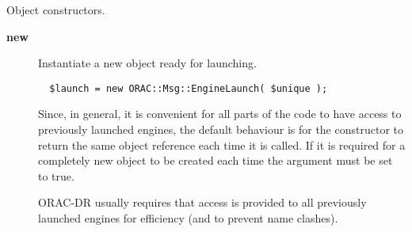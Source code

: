 Object constructors.

\begin{description}

\item[{\textbf{new}}] \mbox{}

Instantiate a new object ready for launching.

\begin{verbatim}
  $launch = new ORAC::Msg::EngineLaunch( $unique );
\end{verbatim}


Since, in general, it is convenient for all parts of the code
to have access to previously launched engines, the default
behaviour is for the constructor to return the same object reference
each time it is called. If it is required for a completely new object
to be created each time the argument must be set to true.



ORAC-DR usually requires that access is provided to all previously
launched engines for efficiency (and to prevent name clashes).

\end{description}
